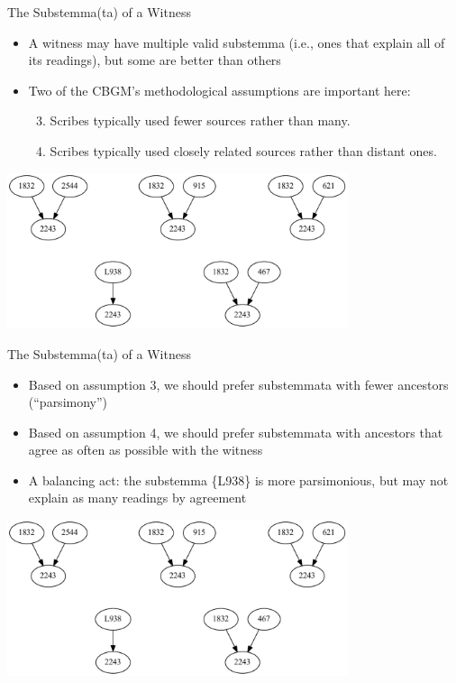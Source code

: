 \documentclass[10pt]{beamer}
\begin{document}
	\begin{frame}{The Substemma(ta) of a Witness}
		\begin{itemize}
			\item A witness may have multiple valid substemma (i.e., ones that explain all of its readings), but some are better than others
			\item Two of the CBGM's methodological assumptions are important here:
			\begin{enumerate}
				\setcounter{enumi}{2} %
				\item Scribes typically used fewer sources rather than many.
				\item Scribes typically used closely related sources rather than distant ones.
			\end{enumerate}
		\end{itemize}
		\begin{center}
			\includegraphics[width=0.75\textwidth]{../graphics/substemmata.pdf}
		\end{center}
	\end{frame}
	\begin{frame}{The Substemma(ta) of a Witness}
		\begin{itemize}
			\item Based on assumption 3, we should prefer substemmata with fewer ancestors (``parsimony'')
			\item Based on assumption 4, we should prefer substemmata with ancestors that agree as often as possible with the witness
			\item A balancing act: the substemma \{L938\} is more parsimonious, but may not explain as many readings by agreement
		\end{itemize}
		\begin{center}
			\includegraphics[width=0.75\textwidth]{../graphics/substemmata.pdf}
		\end{center}
	\end{frame}
\end{document}

